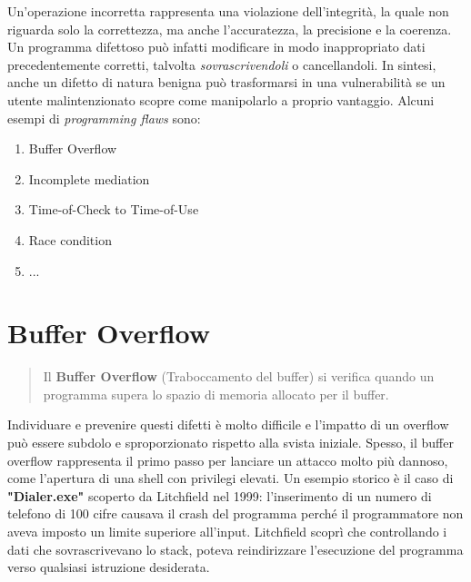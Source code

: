 \documentclass{article}
\begin{document}
\vspace{0.3cm}
\noindent Un'operazione incorretta rappresenta una violazione dell'integrità, la quale non riguarda solo la correttezza, ma anche l'accuratezza, la precisione e la coerenza. 
Un programma difettoso può infatti modificare in modo inappropriato dati precedentemente corretti, talvolta \textit{sovrascrivendoli} o cancellandoli. 
In sintesi, anche un difetto di natura benigna può trasformarsi in una vulnerabilità se un utente malintenzionato scopre come manipolarlo a proprio vantaggio. 
Alcuni esempi di \textit{programming flaws} sono:

\begin{enumerate}
    \item Buffer Overflow
    \item Incomplete mediation
    \item Time-of-Check to Time-of-Use
    \item Race condition
    \item ...
\end{enumerate}

\vspace{0.8cm}

\section*{Buffer Overflow}

\begin{quote}
    Il \textbf{Buffer Overflow} (Traboccamento del buffer) si verifica quando un programma supera lo spazio di memoria allocato per il buffer.
\end{quote}

\noindent Individuare e prevenire questi difetti è molto difficile e l'impatto di un overflow può essere subdolo e sproporzionato rispetto alla svista iniziale. 
Spesso, il buffer overflow rappresenta il primo passo per lanciare un attacco molto più dannoso, come l'apertura di una shell con privilegi elevati. 
Un esempio storico è il caso di \textbf{"Dialer.exe"} scoperto da Litchfield nel 1999: l'inserimento di un numero di telefono di 100 cifre causava il crash del programma perché il programmatore non aveva imposto un limite superiore all'input. 
Litchfield scoprì che controllando i dati che sovrascrivevano lo stack, poteva reindirizzare l'esecuzione del programma verso qualsiasi istruzione desiderata.
\end{document}
